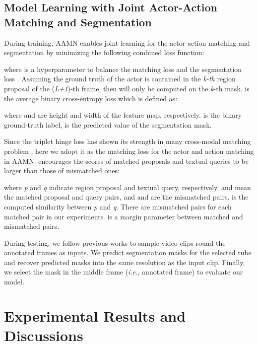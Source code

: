 \documentclass[journal]{IEEEtran}
\begin{document}
\subsection{Model Learning with Joint Actor-Action Matching and Segmentation}
\label{section: training_model}

During training, AAMN enables joint learning for the actor-action matching and segmentation by minimizing the following combined loss function:

where  is a hyperparameter to balance the matching loss  and the segmentation loss . Assuming the ground truth of the actor is contained in the \emph{k-th} region proposal of the (\emph{L+1})-th frame, then  will only be computed on the \emph{k}-th mask.  is the average binary cross-entropy loss which is defined as:

where  and  are height and width of the feature map, respectively.  is the binary ground-truth label,  is the predicted value of the segmentation mask.

Since the triplet hinge loss has shown its strength in many cross-modal matching problem \cite{faghri2018vse++,niu2019improving}, here we adopt it as the matching loss  for the actor and action matching in AAMN.  encourages the scores of matched proposals and textual queries to be larger than those of mismatched ones:

where \emph{p} and \emph{q} indicate region proposal and textual query, respectively.  and  mean the matched proposal and query pairs, and  and  are the mismatched pairs.  is the computed similarity between \emph{p} and \emph{q}. There are  mismatched pairs for each matched pair in our experiments.  is a margin parameter between matched and mismatched pairs.

During testing, we follow previous works \cite{gavrilyuk2018actor,wang2019asymmetric,mcintosh2018multi} to sample video clips round the annotated frames as inputs. We predict segmentation masks for the selected tube and recover predicted masks into the same resolution as the input clip. Finally, we select the mask in the middle frame (\emph{i.e.}, annotated frame) to evaluate our model.


\section{Experimental Results and Discussions}
\end{document}
